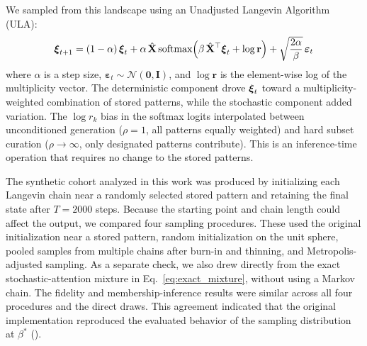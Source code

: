 We sampled from this landscape using an Unadjusted Langevin Algorithm (ULA):
\begin{equation}
    \boldsymbol{\xi}_{t+1} = (1-\alpha)\,\boldsymbol{\xi}_t
    + \alpha\,\hat{\mathbf{X}}\,\text{softmax}\!\left(\beta\,\hat{\mathbf{X}}^\top\boldsymbol{\xi}_t + \log\mathbf{r}\right)
    + \sqrt{\frac{2\alpha}{\beta}}\,\boldsymbol{\varepsilon}_t
    \label{eq:ula}
\end{equation}
where $\alpha$ is a step size, $\boldsymbol{\varepsilon}_t\sim\mathcal{N}(\mathbf{0},\mathbf{I})$,
and $\log\mathbf{r}$ is the element-wise log of the multiplicity vector. The
deterministic component drove $\boldsymbol{\xi}_t$ toward a multiplicity-weighted combination of
stored patterns, while the stochastic component added variation. The
$\log r_k$ bias in the softmax logits interpolated between unconditioned generation ($\rho = 1$,
all patterns equally weighted) and hard subset curation ($\rho \to \infty$, only
designated patterns contribute). This is an inference-time operation that requires
no change to the stored patterns.

The synthetic cohort analyzed in this work was produced by initializing each Langevin
chain near a randomly selected stored pattern and retaining the final state after $T{=}2000$
steps. Because the starting point and chain length could affect the output, we compared four
sampling procedures. These used the original initialization near a stored pattern, random
initialization on the unit sphere, pooled samples from multiple chains after burn-in and
thinning, and Metropolis-adjusted sampling. As a separate check, we also drew directly from
the exact stochastic-attention mixture in Eq.~\eqref{eq:exact_mixture}, without using a Markov
chain. The fidelity and
membership-inference results were similar across all four procedures and the direct draws.
This agreement indicated that the original implementation reproduced the evaluated behavior
of the sampling distribution at $\beta^*$
().

